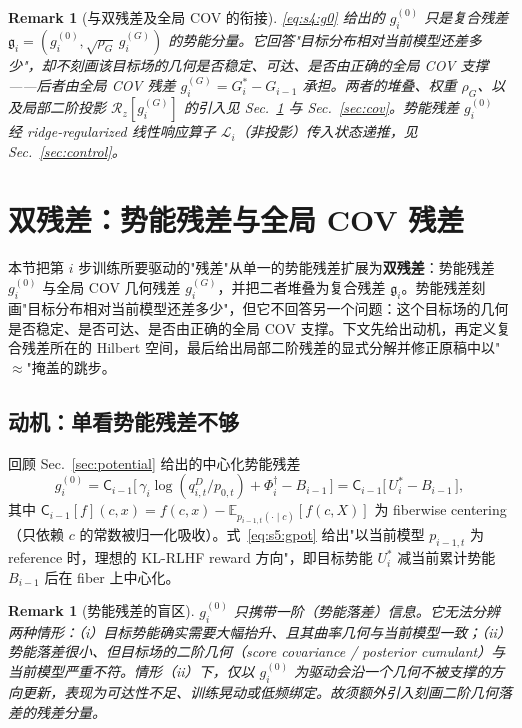 \documentclass[11pt,a4paper]{article}
\newtheorem{remark}[theorem]{Remark}
\newcommand{\E}{\mathbb{E}}
\newcommand{\cL}{\mathcal{L}}   %
\newcommand{\Rstr}{\mathcal{R}}     %
\newcommand{\Center}{\mathsf{C}}    %
\newcommand{\gres}{\bm{\mathfrak{g}}} %
\begin{document}
\begin{remark}[与双残差及全局 COV 的衔接]\label{rem:s4:bridge}
\eqref{eq:s4:g0} 给出的 $g_i^{(0)}$ 只是复合残差 $\gres_i=(g_i^{(0)},\sqrt{\rho_G}\,g_i^{(G)})$ 的势能分量。它回答"目标分布相对当前模型还差多少"，却不刻画该目标场的几何是否稳定、可达、是否由正确的全局 COV 支撑——后者由全局 COV 残差 $g_i^{(G)}=G_i^*-G_{i-1}$ 承担。两者的堆叠、权重 $\rho_G$、以及局部二阶投影 $\Rstr_z[g_i^{(G)}]$ 的引入见 Sec.~\ref{sec:dualres} 与 Sec.~\ref{sec:cov}。势能残差 $g_i^{(0)}$ 经 ridge-regularized 线性响应算子 $\cL_i$（非投影）传入状态递推，见 Sec.~\ref{sec:control}。
\end{remark}

\section{双残差：势能残差与全局 COV 残差}\label{sec:dualres}

本节把第 $i$ 步训练所要驱动的"残差"从单一的势能残差扩展为\textbf{双残差}：势能残差 $g_i^{(0)}$ 与全局 COV 几何残差 $g_i^{(G)}$，并把二者堆叠为复合残差 $\gres_i$。势能残差刻画"目标分布相对当前模型还差多少"，但它不回答另一个问题：这个目标场的几何是否稳定、是否可达、是否由正确的全局 COV 支撑。下文先给出动机，再定义复合残差所在的 Hilbert 空间，最后给出局部二阶残差的显式分解并修正原稿中以"$\approx$"掩盖的跳步。

\subsection{动机：单看势能残差不够}

回顾 Sec.~\ref{sec:potential} 给出的中心化势能残差
\begin{equation}\label{eq:s5:gpot}
g_i^{(0)}=\Center_{i-1}\!\big[\,\gamma_i\log(q_{i,t}^D/p_{0,t})+\Phi_i^\dagger-B_{i-1}\,\big]
=\Center_{i-1}\!\big[\,U_i^*-B_{i-1}\,\big],
\end{equation}
其中 $\Center_{i-1}[f](c,x)=f(c,x)-\E_{p_{i-1,t}(\cdot\mid c)}[f(c,X)]$ 为 fiberwise centering（只依赖 $c$ 的常数被归一化吸收）。式~\eqref{eq:s5:gpot} 给出"以当前模型 $p_{i-1,t}$ 为 reference 时，理想的 KL-RLHF reward 方向"，即目标势能 $U_i^*$ 减当前累计势能 $B_{i-1}$ 后在 fiber 上中心化。

\begin{remark}[势能残差的盲区]\label{rem:s5:blind}
$g_i^{(0)}$ 只携带一阶（势能落差）信息。它无法分辨两种情形：（i）目标势能确实需要大幅抬升、且其曲率几何与当前模型一致；（ii）势能落差很小、但目标场的二阶几何（score covariance / posterior cumulant）与当前模型严重不符。情形（ii）下，仅以 $g_i^{(0)}$ 为驱动会沿一个\emph{几何不被支撑}的方向更新，表现为可达性不足、训练晃动或低频绑定。故须额外引入刻画二阶几何落差的残差分量。
\end{remark}
\end{document}
